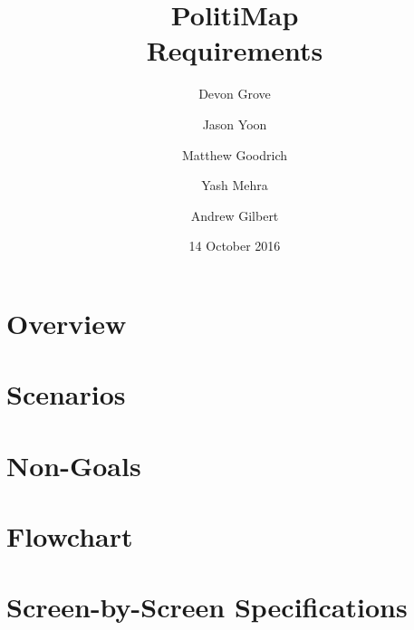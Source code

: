 \documentclass{article}
\title{PolitiMap\\\large Requirements}
\author{Devon Grove \and
  Jason Yoon \and
  Matthew Goodrich \and
  Yash Mehra \and
  Andrew Gilbert}
\date{14 October 2016}
\begin{document}
\maketitle

\section{Overview}
\section{Scenarios}
\section{Non-Goals}
\section{Flowchart}
\section{Screen-by-Screen Specifications}
\end{document}
